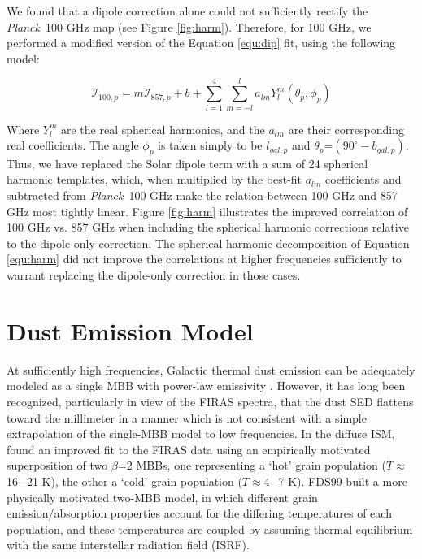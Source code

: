 \documentclass{emulateapj}
\newcommand{\PLANCK}{{\it Planck}}
\begin{document}
We found that a dipole correction alone could not sufficiently rectify the 
\PLANCK~100 GHz map (see Figure \ref{fig:harm}). Therefore, for 100 GHz, we 
performed a modified version of the Equation \ref{equ:dip} fit, using the 
following model:

\begin{equation} \label{equ:harm}
\mathcal{I}_{100, p} = m\mathcal{I}_{857, p} + b + \sum_{l=1}^{4} \sum_{m=-l}^{l} a_{lm}Y_{l}^{m}(\theta_p, \phi_p)
\end{equation}

Where $Y_{l}^{m}$ are the real spherical harmonics, and the $a_{lm}$ are their 
corresponding real coefficients. The angle $\phi_p$ is taken simply to be 
$l_{gal, p}$ and $\theta_p$=$(90^{\circ}-b_{gal, p})$. Thus, we have replaced 
the Solar dipole term with a sum of 24 spherical harmonic templates, which, 
when multiplied by the best-fit $a_{lm}$ coefficients and subtracted from 
\PLANCK~100 GHz make the relation between 100 GHz and 857 GHz most tightly 
linear. Figure \ref{fig:harm} illustrates the improved correlation of 100 GHz 
vs. 857 GHz when including the spherical harmonic corrections relative to the 
dipole-only correction. The spherical harmonic decomposition of Equation 
\ref{equ:harm} did not improve the correlations at higher frequencies 
sufficiently to warrant replacing the dipole-only correction in those cases.


\section{Dust Emission Model}
\label{sec:modeling}



At sufficiently high frequencies, Galactic thermal dust emission can be 
adequately modeled as a single MBB with power-law emissivity 
\citep[e.g. SFD;][]{planckdust}. However, it has long been recognized, 
particularly in view of the FIRAS spectra, that the dust SED flattens toward 
the millimeter in a manner which is not consistent with a simple extrapolation 
of the single-MBB model to low frequencies. In the diffuse ISM, \cite{reach95} 
found an improved fit to the FIRAS data using an empirically motivated 
superposition of two $\beta$=2 MBBs, one representing a `hot' grain population 
($T$$\approx$16$-$21 K), the other a `cold' grain population 
($T$$\approx$4$-$7 K). FDS99 built a more physically motivated two-MBB model, 
in which different grain emission/absorption properties account for the 
differing temperatures of each population, and these temperatures are coupled 
by assuming thermal equilibrium with the same interstellar radiation field 
(ISRF).
\end{document}
